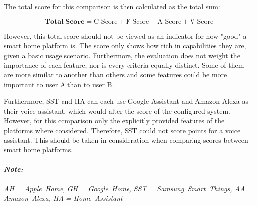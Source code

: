 The total score for this comparison is then calculated as the total sum:

$$
\textbf{Total Score} = \text{C-Score} + \text{F-Score} + \text{A-Score} + \text{V-Score}
$$

However, this total score should not be viewed as an indicator for how "good" a smart home platform is. The score only shows how rich in capabilities they are, given a basic usage scenario. Furthermore, the evaluation does not weight the importance of each feature, nor is every criteria equally distinct. Some of them are more similar to another than others and some features could be more important to user A than to user B.

Furthermore, SST and HA can each use Google Assistant and Amazon Alexa as their voice assistant, which would alter the score of the configured system. However, for this comparison only the explicitly provided features of the platforms where considered. Therefore, SST could not score points for a voice assistant. This should be taken in consideration when comparing scores between smart home platforms.

\noindent
\paragraph{\textit{Note:}}
\textit{AH = Apple~Home, GH = Google~Home, SST = Samsung~Smart~Things, AA = Amazon~Alexa, HA = Home~Assistant}

